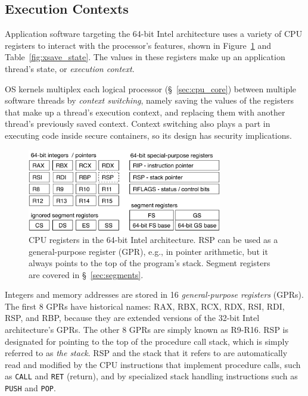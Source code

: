 \subsection{Execution Contexts}
\label{sec:registers}

Application software targeting the 64-bit Intel architecture uses a variety of
CPU registers to interact with the processor's features, shown in
Figure~\ref{fig:cpu_registers} and Table~\ref{fig:xsave_state}. The values in
these registers make up an application thread's state, or \textit{execution
context}.

OS kernels multiplex each logical processor (\S~\ref{sec:cpu_core}) between
multiple software threads by \textit{context switching}, namely saving the
values of the registers that make up a thread's execution context, and
replacing them with another thread's previously saved context. Context
switching also plays a part in executing code inside secure containers, so its
design has security implications.


\begin{figure}[hbt]
  \centering
  \includegraphics[width=85mm]{figures/cpu_registers.pdf}
  \caption{
    CPU registers in the 64-bit Intel architecture. RSP can be used as a
    general-purpose register (GPR), e.g., in pointer arithmetic, but it always
    points to the top of the program's stack. Segment registers are covered in
    \S~\ref{sec:segments}.
  }
  \label{fig:cpu_registers}
\end{figure}

Integers and memory addresses are stored in 16 \textit{general-purpose
registers} (GPRs). The first 8 GPRs have historical names: RAX, RBX, RCX,
RDX, RSI, RDI, RSP, and RBP, because they are extended versions of the 32-bit
Intel architecture's GPRs. The other 8 GPRs are simply known as R9-R16. RSP is
designated for pointing to the top of the procedure call stack, which is simply
referred to as \textit{the stack}. RSP and the stack that it refers to are
automatically read and modified by the CPU instructions that implement
procedure calls, such as \texttt{CALL} and \texttt{RET} (return), and by
specialized stack handling instructions such as \texttt{PUSH} and \texttt{POP}.

